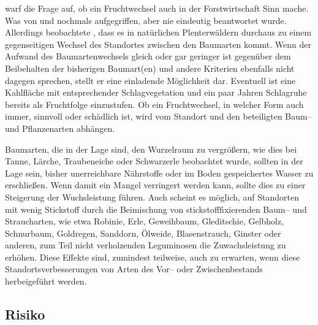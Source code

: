 \documentclass[twocolumn]{scrartcl}
\begin{document}
\cite{jentsch1911fruchtwechsel} warf die Frage auf, ob ein Fruchtwechsel auch in
der Forstwirtschaft Sinn mache. Was von \cite{sieber1919Holzartenwechsel} und
\cite{fabricius1924Holzartenwechsel} nochmals aufgegriffen, aber nie eindeutig
beantwortet wurde. Allerdings beobachtete \cite{simak1951Baumartenwechsel},
dass es in natürlichen Plenterwäldern durchaus zu einem gegenseitigen Wechsel
des Standortes zwischen den Baumarten kommt. Wenn der Aufwand des
Baumartenwechsels gleich oder gar geringer ist gegenüber dem Beibehalten der
bisherigen Baumart(en) und andere Kriterien ebenfalls nicht dagegen sprechen,
stellt er eine einladende Möglichkeit dar. Eventuell ist eine
\glqq{}Kahlfläche\grqq{} mit entsprechender Schlagvegetation und ein paar
Jahren Schlagruhe bereits als Fruchtfolge einzustufen. Ob ein Fruchtwechsel, in
welcher Form auch immer, sinnvoll oder schädlich ist, wird vom Standort und den
beteiligten Baum-- und Pflanzenarten abhängen.

Baumarten, die in der Lage sind, den Wurzelraum zu vergrößern, wie dies
bei Tanne, Lärche, Traubeneiche oder Schwarzerle \cite[S.~114, 130,
150, 180]{koestler1969WurzelnDerWaldbaeume} beobachtet wurde, sollten
in der Lage sein, bisher unerreichbare Nährstoffe oder im Boden
gespeichertes Wasser zu erschließen. Wenn damit ein Mangel verringert werden kann, sollte dies zu einer Steigerung der Wuchsleistung führen.
Auch scheint es möglich, auf Standorten mit wenig Stickstoff
durch die Beimischung von stickstofffixierenden Baum-- und
Straucharten, wie etwa Robinie, Erle, Geweihbaum, Gleditschie,
Gelbholz, Schnurbaum, Goldregen, Sanddorn, Ölweide, Blasenstrauch,
Ginster oder anderen, zum Teil nicht verholzenden Leguminosen die
Zuwachsleistung zu erhöhen. Diese Effekte sind, zumindest teilweise,
auch zu erwarten, wenn diese Standortsverbesserungen von Arten des Vor-- oder Zwischenbestands herbeigeführt werden.

\subsection{Risiko}
\label{ssec:risiko}
\end{document}
